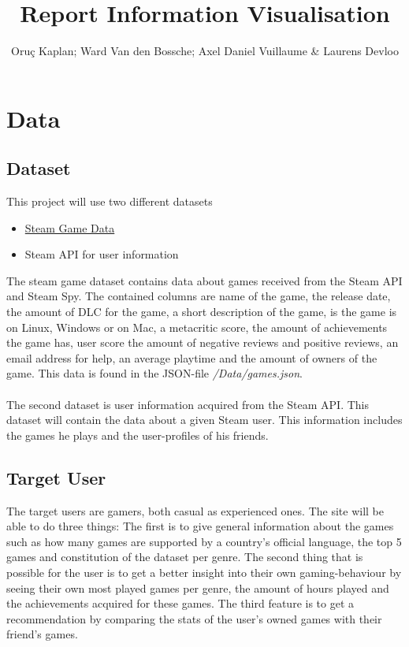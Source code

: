 \documentclass{article}
\begin{document}
	\title{Report Information Visualisation}
	\author{Oruç Kaplan; Ward Van den Bossche; Axel Daniel Vuillaume \& Laurens Devloo}
	\maketitle
	\tableofcontents
	\newpage
	
	\section{Data}
	
	\subsection{Dataset}
	
	This project will use two different datasets
	
	\begin{itemize}
		\item \href{https://www.kaggle.com/datasets/fronkongames/steam-games-dataset/code}{Steam Game Data}
		\item Steam API for user information
	\end{itemize}
	
	The steam game dataset contains data about games received from the Steam API and Steam Spy. The contained columns are name of the game, the release date, the amount of DLC for the game, a short description of the game, is the game is on Linux, Windows or on Mac, a metacritic score, the amount of achievements the game has, user score the amount of negative reviews and positive reviews, an email address for help, an average playtime and the amount of owners of the game. This data is found in the JSON-file \textit{/Data/games.json}.\\
	\\
	The second dataset is user information acquired from the Steam API. This dataset will contain the data about a given Steam user. This information includes the games he plays and the user-profiles of his friends.
	
	\subsection{Target User}
	
	The target users are gamers, both casual as experienced ones. The site will be able to do three things: The first is to give general information about the games such as how many games are supported by a country's official language, the top 5 games and constitution of the dataset per genre. The second thing that is possible for the user is to get a better insight into their own gaming-behaviour by seeing their own most played games per genre, the amount of hours played and the achievements acquired for these games. The third feature is to get a recommendation by comparing the stats of the user's owned games with their friend's games.
	
\end{document}
